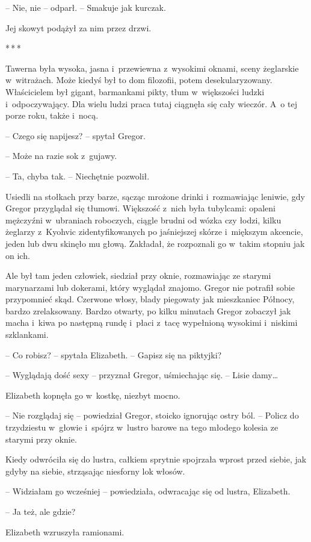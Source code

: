 \documentclass[oneside,polish,12pt,sfheadings]{mwbk}
\newcommand{\threeast}{\bigskip\par\centerline{*\,*\,*}\medskip\par}%
\begin{document}
-- Nie, nie -- odparł. -- Smakuje jak kurczak.

Jej skowyt podążył za nim przez drzwi.

\threeast 

Tawerna była wysoka, jasna i~przewiewna z~wysokimi oknami, sceny
żeglarskie w~witrażach. Może kiedyś był to dom filozofii, potem
desekularyzowany. Właścicielem był gigant, barmankami pikty, tłum w~większości ludzki i~odpoczywający. Dla wielu ludzi praca tutaj ciągnęła
się cały wieczór. A~o tej porze roku, także i~nocą.

-- Czego się napijesz? -- spytał Gregor.

-- Może na razie sok z~gujawy.

-- Ta, chyba tak. -- Niechętnie pozwolił.

Usiedli na stołkach przy barze, sącząc mrożone drinki i~rozmawiając
leniwie, gdy Gregor przyglądał się tłumowi. Większość z~nich była
tubylcami: opaleni mężczyźni w~ubraniach roboczych, ciągle brudni od
wózka czy łodzi, kilku żeglarzy z~Kyohvic zidentyfikowanych po
jaśniejszej skórze i~miększym akcencie, jeden lub dwu skinęło mu głową.
Zakładał, że rozpoznali go w~takim stopniu jak on ich.

Ale był tam jeden człowiek, siedział przy oknie, rozmawiając ze starymi
marynarzami lub dokerami, który wyglądał znajomo. Gregor nie potrafił
sobie przypomnieć skąd. Czerwone włosy, blady piegowaty jak mieszkaniec
Północy, bardzo zrelaksowany. Bardzo otwarty, po kilku minutach Gregor
zobaczył jak macha i~kiwa po następną rundę i~płaci z~tacę wypełnioną
wysokimi i~niskimi szklankami.

-- Co robisz? -- spytała Elizabeth. -- Gapisz się na piktyjki?

-- Wyglądają dość sexy -- przyznał Gregor, uśmiechając się. -- Lisie damy\ldots

Elizabeth kopnęła go w~kostkę, niezbyt mocno.

-- Nie rozglądaj się -- powiedział Gregor, stoicko ignorując ostry ból. -- Policz do trzydziestu w~głowie i~spójrz w~lustro barowe na tego młodego
kolesia ze starymi przy oknie.

Kiedy odwróciła się do lustra, całkiem sprytnie spojrzała wprost przed
siebie, jak gdyby na siebie, strząsając niesforny lok włosów.

-- Widziałam go wcześniej -- powiedziała, odwracając się od lustra,
Elizabeth.

-- Ja też, ale gdzie?

Elizabeth wzruszyła ramionami. 
\end{document}
